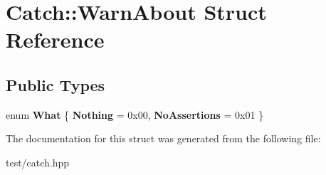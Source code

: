 \hypertarget{structCatch_1_1WarnAbout}{}\section{Catch\+:\+:Warn\+About Struct Reference}
\label{structCatch_1_1WarnAbout}
\subsection*{Public Types}
\begin{DoxyCompactItemize}
\item 
enum {\bfseries What} \{ {\bfseries Nothing} = 0x00, 
{\bfseries No\+Assertions} = 0x01
 \}\hypertarget{structCatch_1_1WarnAbout_ae3dde70ef78d700ea896eb29314e0fa3}{}\label{structCatch_1_1WarnAbout_ae3dde70ef78d700ea896eb29314e0fa3}

\end{DoxyCompactItemize}


The documentation for this struct was generated from the following file\+:\begin{DoxyCompactItemize}
\item 
test/catch.\+hpp\end{DoxyCompactItemize}
